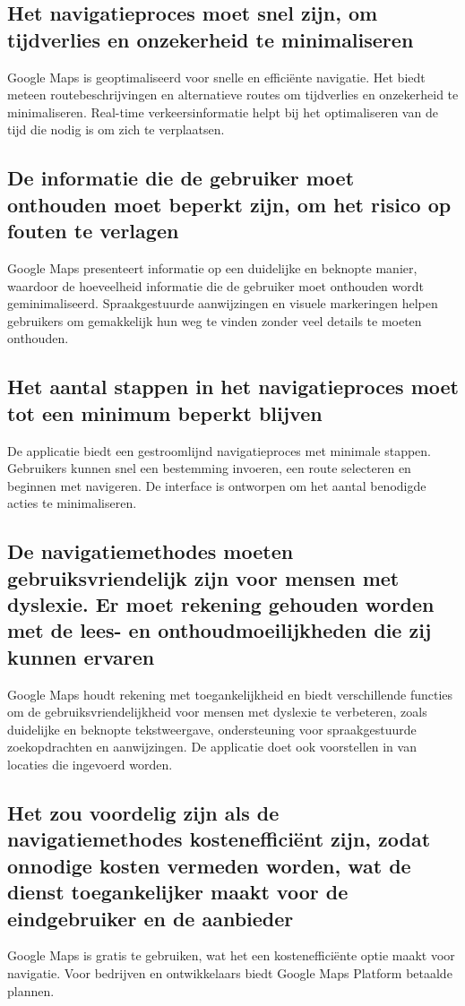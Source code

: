 \subsection*{Het navigatieproces moet snel zijn, om tijdverlies en onzekerheid te minimaliseren}
Google Maps is geoptimaliseerd voor snelle en efficiënte navigatie. Het biedt meteen routebeschrijvingen en alternatieve routes om tijdverlies en onzekerheid te minimaliseren. Real-time verkeersinformatie helpt bij het optimaliseren van de tijd die nodig is om zich te verplaatsen.

\subsection*{De informatie die de gebruiker moet onthouden moet beperkt zijn, om het risico op fouten te verlagen}
Google Maps presenteert informatie op een duidelijke en beknopte manier, waardoor de hoeveelheid informatie die de gebruiker moet onthouden wordt geminimaliseerd. Spraakgestuurde aanwijzingen en visuele markeringen helpen gebruikers om gemakkelijk hun weg te vinden zonder veel details te moeten onthouden.

\subsection*{Het aantal stappen in het navigatieproces moet tot een minimum beperkt blijven}
De applicatie biedt een gestroomlijnd navigatieproces met minimale stappen. Gebruikers kunnen snel een bestemming invoeren, een route selecteren en beginnen met navigeren. De interface is ontworpen om het aantal benodigde acties te minimaliseren.

\subsection*{De navigatiemethodes moeten gebruiksvriendelijk zijn voor mensen met dyslexie. Er moet rekening gehouden worden met de lees- en onthoudmoeilijkheden die zij kunnen ervaren}
Google Maps houdt rekening met toegankelijkheid en biedt verschillende functies om de gebruiksvriendelijkheid voor mensen met dyslexie te verbeteren, zoals duidelijke en beknopte tekstweergave, ondersteuning voor spraakgestuurde zoekopdrachten en aanwijzingen. De applicatie doet ook voorstellen in van locaties die ingevoerd worden.

\subsection*{Het zou voordelig zijn als de navigatiemethodes kostenefficiënt zijn, zodat onnodige kosten vermeden worden, wat de dienst toegankelijker maakt voor de eindgebruiker en de aanbieder}
Google Maps is gratis te gebruiken, wat het een kostenefficiënte optie maakt voor navigatie. Voor bedrijven en ontwikkelaars biedt Google Maps Platform betaalde plannen.

